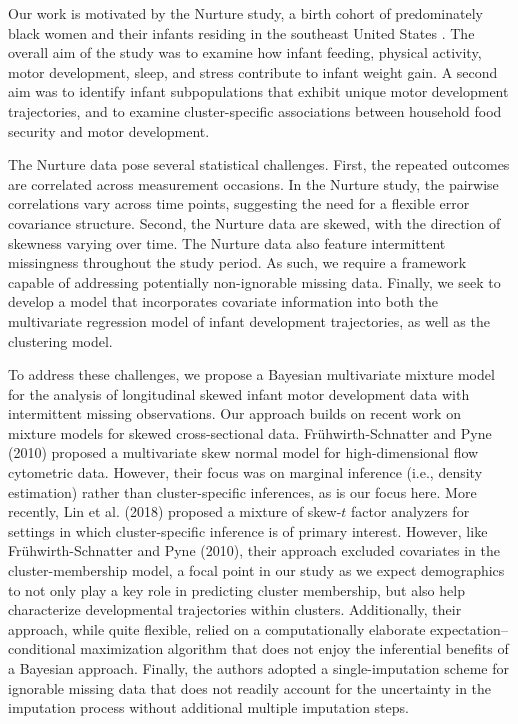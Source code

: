 \documentclass[useAMS,usenatbib,referee]{biom}
\begin{document}
Our work is motivated by the Nurture study, a birth cohort of predominately black women and their infants residing in the southeast United States \citep{neelon2017cohort}. The overall aim of the study was to examine how infant feeding, physical activity, motor development, sleep, and stress contribute to infant weight gain. A second aim was to identify infant subpopulations that exhibit unique motor development trajectories, and to examine cluster-specific associations between household food security and motor development.

The Nurture data pose several statistical challenges. First, the repeated outcomes are correlated across measurement occasions. In the Nurture study, the pairwise correlations vary across time points, suggesting the need for a flexible error covariance structure. Second, the Nurture data are skewed, with the direction of skewness varying over time. The Nurture data also feature intermittent missingness throughout the study period. As such, we require a framework capable of addressing potentially non-ignorable missing data. Finally, we seek to develop a model that incorporates covariate information into both the multivariate regression model of infant development trajectories, as well as the clustering model.

To address these challenges, we propose a Bayesian multivariate mixture model for the analysis of longitudinal skewed infant motor development data with intermittent missing observations. Our approach builds on recent work on mixture models for skewed cross-sectional data. Fr\"{u}hwirth-Schnatter and Pyne (2010) proposed a multivariate skew normal model for high-dimensional flow cytometric data. However, their focus was on marginal inference (i.e., density estimation) rather than cluster-specific inferences, as is our focus here. More recently, Lin {et al.} (2018) proposed a mixture of skew-$t$ factor analyzers for settings in which cluster-specific inference is of primary interest. However, like Fr\"{u}hwirth-Schnatter and Pyne (2010), their approach excluded covariates in the cluster-membership model, a focal point in our study as we expect demographics to not only play a key role in predicting cluster membership, but also help characterize developmental trajectories within clusters. Additionally, their approach, while quite flexible, relied on a computationally elaborate expectation--conditional maximization algorithm that does not enjoy the inferential benefits of a Bayesian approach. Finally, the authors adopted a single-imputation scheme for ignorable missing data that does not readily account for the uncertainty in the imputation process without additional multiple imputation steps.
\end{document}
